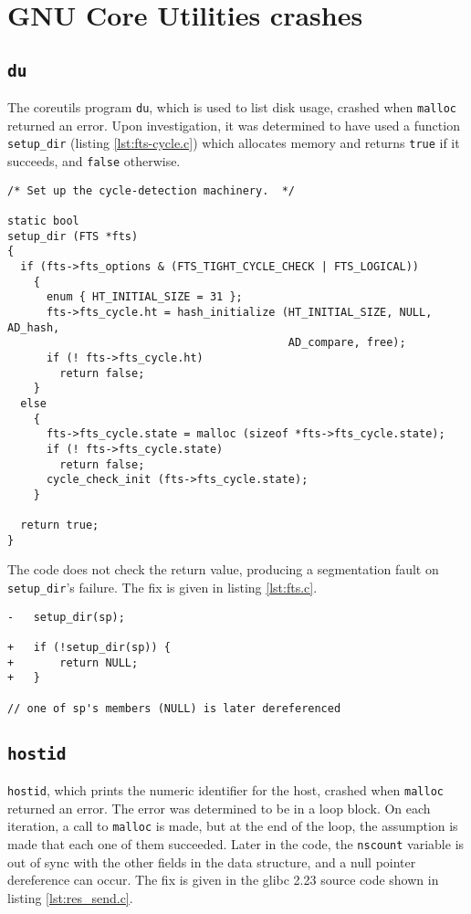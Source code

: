 \section{GNU Core Utilities crashes}
\label{appendix:coreutils}
\subsection{\texttt{du}}
The coreutils program \texttt{du}, which is used to list disk usage, crashed when \texttt{malloc} returned an error. Upon investigation, it was determined to have used a function \texttt{setup\_dir} (listing \ref{lst:fts-cycle.c}) which allocates memory and returns \texttt{true} if it succeeds, and \texttt{false} otherwise.

\begin{lstlisting}[label={lst:fts-cycle.c},firstnumber=47, caption={\texttt{lib/fts-cycle.c}}]
/* Set up the cycle-detection machinery.  */

static bool
setup_dir (FTS *fts)
{
  if (fts->fts_options & (FTS_TIGHT_CYCLE_CHECK | FTS_LOGICAL))
    {
      enum { HT_INITIAL_SIZE = 31 };
      fts->fts_cycle.ht = hash_initialize (HT_INITIAL_SIZE, NULL, AD_hash,
                                           AD_compare, free);
      if (! fts->fts_cycle.ht)
        return false;
    }
  else
    {
      fts->fts_cycle.state = malloc (sizeof *fts->fts_cycle.state);
      if (! fts->fts_cycle.state)
        return false;
      cycle_check_init (fts->fts_cycle.state);
    }

  return true;
}
\end{lstlisting}

The code does not check the return value, producing a segmentation fault on \texttt{setup\_dir}'s failure.
 The fix is given in listing \ref{lst:fts.c}.
\begin{lstlisting}[label={lst:fts.c},firstnumber=986, caption={\texttt{lib/fts.c}}]
-	setup_dir(sp);

+	if (!setup_dir(sp)) {
+		return NULL;
+	}

// one of sp's members (NULL) is later dereferenced
\end{lstlisting}

\subsection{\texttt{hostid}}
\texttt{hostid}, which prints the numeric identifier for the host, crashed when \texttt{malloc} returned an error. The error was determined to be in a loop block. On each iteration, a call to \texttt{malloc} is made, but at the end of the loop, the assumption is made that each one of them succeeded. Later in the code, the \texttt{nscount} variable is out of sync with the other fields in the data structure, and a null pointer dereference can occur. The fix is given in the glibc 2.23 source code shown in listing \ref{lst:res_send.c}.


